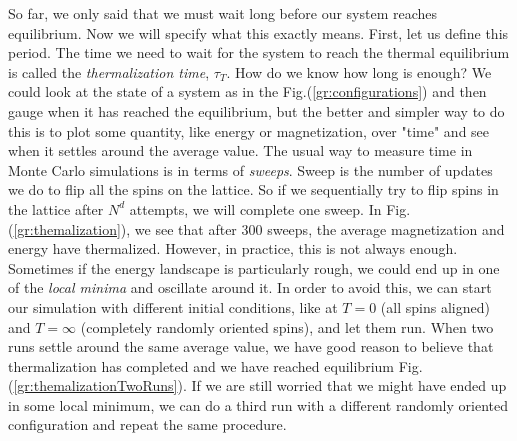 So far, we only said that we must wait long before our system reaches equilibrium. Now we will specify what this exactly means. First, let us define this period. The time we need to wait for the system to reach the thermal equilibrium is called the \textit{thermalization time}, $\tau_T$. How do we know how long is enough? We could look at the state of a system as in the Fig.(\ref{gr:configurations}) and then gauge when it has reached the equilibrium, but the better and simpler way to do this is to plot some quantity, like energy or magnetization, over "time" and see when it settles around the average value. The usual way to measure time in Monte Carlo simulations is in terms of \textit{sweeps}. Sweep is the number of updates we do to flip all the spins on the lattice. So if we sequentially try to flip spins in the lattice after $N^d$ attempts, we will complete one sweep. In Fig.(\ref{gr:themalization}), we see that after $300$ sweeps, the average magnetization and energy have thermalized. However, in practice, this is not always enough. Sometimes if the energy landscape is particularly rough, we could end up in one of the \textit{local minima} and oscillate around it. In order to avoid this, we can start our simulation with different initial conditions, like at $T=0$ (all spins aligned) and $T=\infty$ (completely randomly oriented spins), and let them run. When two runs settle around the same average value, we have good reason to believe that thermalization has completed and we have reached equilibrium Fig.(\ref{gr:themalizationTwoRuns}). If we are still worried that we might have ended up in some local minimum, we can do a third run with a different randomly oriented configuration and repeat the same procedure.

